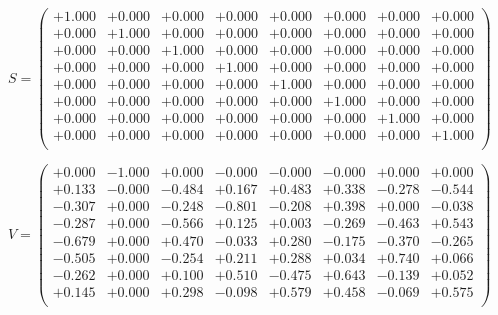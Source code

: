 \documentclass[9pt]{article}
\theoremstyle{plain}
\theoremstyle{definition}
\theoremstyle{remark}
\numberwithin{equation}{section}
\begin{document}
$S = \left(
\begin{array}{
cccccccc}
+1.000 & +0.000 & +0.000 & +0.000 & +0.000 & +0.000 & +0.000 & +0.000 \\
+0.000 & +1.000 & +0.000 & +0.000 & +0.000 & +0.000 & +0.000 & +0.000 \\
+0.000 & +0.000 & +1.000 & +0.000 & +0.000 & +0.000 & +0.000 & +0.000 \\
+0.000 & +0.000 & +0.000 & +1.000 & +0.000 & +0.000 & +0.000 & +0.000 \\
+0.000 & +0.000 & +0.000 & +0.000 & +1.000 & +0.000 & +0.000 & +0.000 \\
+0.000 & +0.000 & +0.000 & +0.000 & +0.000 & +1.000 & +0.000 & +0.000 \\
+0.000 & +0.000 & +0.000 & +0.000 & +0.000 & +0.000 & +1.000 & +0.000 \\
+0.000 & +0.000 & +0.000 & +0.000 & +0.000 & +0.000 & +0.000 & +1.000 \\
\end{array}
\right)$ \newline 

$V = \left(
\begin{array}{
cccccccc}
+0.000 & -1.000 & +0.000 & -0.000 & -0.000 & -0.000 & +0.000 & +0.000 \\
+0.133 & -0.000 & -0.484 & +0.167 & +0.483 & +0.338 & -0.278 & -0.544 \\
-0.307 & +0.000 & -0.248 & -0.801 & -0.208 & +0.398 & +0.000 & -0.038 \\
-0.287 & +0.000 & -0.566 & +0.125 & +0.003 & -0.269 & -0.463 & +0.543 \\
-0.679 & +0.000 & +0.470 & -0.033 & +0.280 & -0.175 & -0.370 & -0.265 \\
-0.505 & +0.000 & -0.254 & +0.211 & +0.288 & +0.034 & +0.740 & +0.066 \\
-0.262 & +0.000 & +0.100 & +0.510 & -0.475 & +0.643 & -0.139 & +0.052 \\
+0.145 & +0.000 & +0.298 & -0.098 & +0.579 & +0.458 & -0.069 & +0.575 \\
\end{array}
\right)$ \newline 
\end{document}
